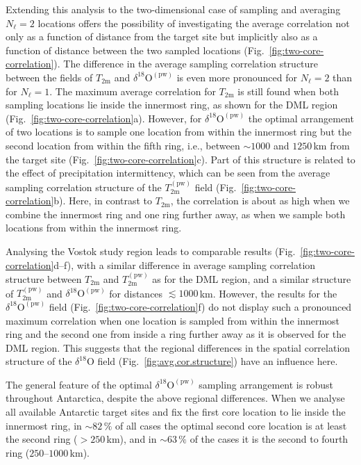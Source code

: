 \documentclass[cp, manuscript]{copernicus}
\begin{document}
Extending this analysis to the two-dimensional case of sampling and averaging
$N_{\ell}=2$ locations offers the possibility of investigating the average
correlation not only as a function of distance from the target site but
implicitly also as a function of distance between the two sampled locations
(Fig.~\ref{fig:two-core-correlation}). The difference in the average sampling
correlation structure between the fields of $T_{\mathrm{2m}}$ and
$\delta^{18}\mathrm{O}^{\mathrm{(pw)}}$ is even more pronounced for $N_{\ell}=2$
than for $N_{\ell}=1$. The maximum average correlation for $T_{\mathrm{2m}}$ is
still found when both sampling locations lie inside the innermost ring, as shown
for the DML region (Fig.~\ref{fig:two-core-correlation}a). However, for
$\delta^{18}\mathrm{O}^{\mathrm{(pw)}}$ the optimal arrangement of two locations
is to sample one location from within the innermost ring but the second location
from within the fifth ring, i.e., between $\sim1000$ and $1250$\,km from the
target site (Fig.~\ref{fig:two-core-correlation}c). Part of this structure is
related to the effect of precipitation intermittency, which can be seen from the
average sampling correlation structure of the $T_{\mathrm{2m}}^{\mathrm{(pw)}}$
field (Fig.~\ref{fig:two-core-correlation}b). Here, in contrast to
$T_{\mathrm{2m}}$, the correlation is about as high when we combine the
innermost ring and one ring further away, as when we sample both locations from
within the innermost ring.

Analysing the Vostok study region leads to comparable results
(Fig.~\ref{fig:two-core-correlation}d--f), with a similar difference in average
sampling correlation structure between $T_{\mathrm{2m}}$ and
$T_{\mathrm{2m}}^{\mathrm{(pw)}}$ as for the DML region, and a similar structure
of $T_{\mathrm{2m}}^{\mathrm{(pw)}}$ and $\delta^{18}\mathrm{O}^{\mathrm{(pw)}}$
for distances $\lesssim1000$\,km.  However, the results for the
$\delta^{18}\mathrm{O}^{\mathrm{(pw)}}$ field
(Fig.~\ref{fig:two-core-correlation}f) do not display such a pronounced maximum
correlation when one location is sampled from within the innermost ring and the
second one from inside a ring further away as it is observed for the DML
region. This suggests that the regional differences in the spatial correlation
structure of the $\delta^{18}\mathrm{O}$ field
(Fig.~\ref{fig:avg.cor.structure}) have an influence here.

The general feature of the optimal $\delta^{18}\mathrm{O}^{\mathrm{(pw)}}$
sampling arrangement is robust throughout Antarctica, despite the above regional
differences. When we analyse all available Antarctic target sites and fix the
first core location to lie inside the innermost ring, in $\sim82\,\%$ of all
cases the optimal second core location is at least the second ring ($>250$\,km),
and in $\sim63\,\%$ of the cases it is the second to fourth ring
($250$--$1000$\,km).
\end{document}
